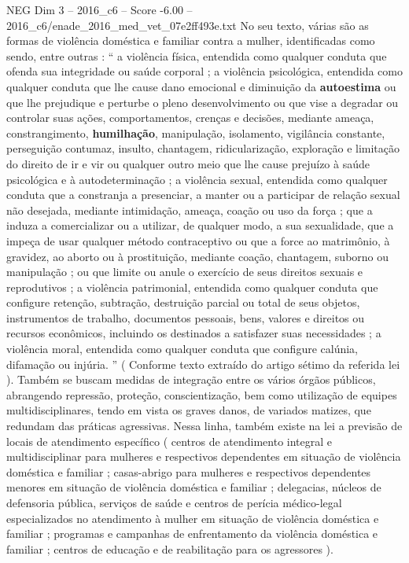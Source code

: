 \begin{textsample}{NEG Dim 3 – 2016\_c6 – Score -6.00 – 2016\_c6/enade\_2016\_med\_vet\_07e2ff493e.txt}
No seu texto, várias são as formas de violência doméstica e familiar contra a mulher, identificadas como sendo, entre outras : “ a violência física, entendida como qualquer conduta que ofenda sua integridade ou saúde corporal ; a violência psicológica, entendida como qualquer conduta que lhe cause dano emocional e diminuição da \textbf{autoestima} ou que lhe prejudique e perturbe o pleno desenvolvimento ou que vise a degradar ou controlar suas ações, comportamentos, crenças e decisões, mediante ameaça, constrangimento, \textbf{humilhação}, manipulação, isolamento, vigilância constante, perseguição contumaz, insulto, chantagem, ridicularização, exploração e limitação do direito de ir e vir ou qualquer outro meio que lhe cause prejuízo à saúde psicológica e à autodeterminação ; a violência sexual, entendida como qualquer conduta que a constranja a presenciar, a manter ou a participar de relação sexual não desejada, mediante intimidação, ameaça, coação ou uso da força ; que a induza a comercializar ou a utilizar, de qualquer modo, a sua sexualidade, que a impeça de usar qualquer método contraceptivo ou que a force ao matrimônio, à gravidez, ao aborto ou à prostituição, mediante coação, chantagem, suborno ou manipulação ; ou que limite ou anule o exercício de seus direitos sexuais e reprodutivos ; a violência patrimonial, entendida como qualquer conduta que configure retenção, subtração, destruição parcial ou total de seus objetos, instrumentos de trabalho, documentos pessoais, bens, valores e direitos ou recursos econômicos, incluindo os destinados a satisfazer suas necessidades ; a violência moral, entendida como qualquer conduta que configure calúnia, difamação ou injúria. ” ( Conforme texto extraído do artigo sétimo da referida lei ).
Também se buscam medidas de integração entre os vários órgãos públicos, abrangendo repressão, proteção, conscientização, bem como utilização de equipes multidisciplinares, tendo em vista os graves danos, de variados matizes, que redundam das práticas agressivas.
Nessa linha, também existe na lei a previsão de locais de atendimento específico ( centros de atendimento integral e multidisciplinar para mulheres e respectivos dependentes em situação de violência doméstica e familiar ; casas-abrigo para mulheres e respectivos dependentes menores em situação de violência doméstica e familiar ; delegacias, núcleos de defensoria pública, serviços de saúde e centros de perícia médico-legal especializados no atendimento à mulher em situação de violência doméstica e familiar ; programas e campanhas de enfrentamento da violência doméstica e familiar ; centros de educação e de reabilitação para os agressores ).

\end{textsample}
